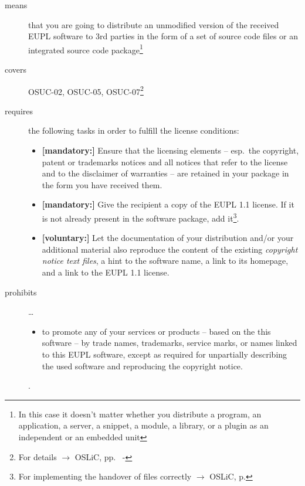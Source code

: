 \begin{description}

\item[means] that you are going to distribute an unmodified version of the
received EUPL software to 3rd parties in the form of a set of source code files or
an integrated source code package\footnote{In this case it doesn't matter
whether you  distribute a program, an application, a server, a snippet, a
module, a library, or a plugin as an independent or an embedded unit}

\item[covers] OSUC-02, OSUC-05, OSUC-07\footnote{For details $\rightarrow$ OSLiC, pp.\ 
\pageref{OSUC-02-DEF} - \pageref{OSUC-07-DEF}}

\item[requires] the following tasks in order to fulfill the license conditions:
\begin{itemize}
  
  \item \textbf{[mandatory:]} Ensure that the licensing elements -- esp.\ the
  copyright, patent or trademarks notices and all notices that refer to the
  license and to the disclaimer of warranties -- are retained in your package in
  the form you have received them.
  
  \item \textbf{[mandatory:]} Give the recipient a copy of the EUPL 1.1
  license. If it is not already present in the software package, add
  it\footnote{For implementing the handover of files correctly $\rightarrow$
  OSLiC, p. \pageref{DistributingFilesHint}}.
  
  \item \textbf{[voluntary:]} Let the documentation of your distribution and/or
  your additional material also reproduce the content of the existing
  \emph{copyright notice text files}, a hint to the software name, a link to its
  homepage, and a link to the EUPL 1.1 license.
\end{itemize}

\item[prohibits] \ldots
\begin{itemize}
  \item to promote any of your services or products -- based on the this software
  -- by trade names, trademarks, service marks, or names linked to this EUPL
  software, except as required for unpartially describing the used software and
  reproducing the copyright notice.
\end{itemize}.

\end{description}


